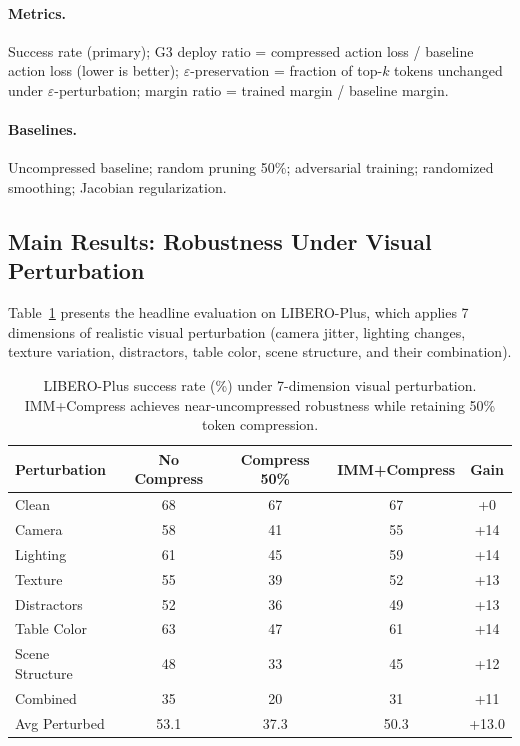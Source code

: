 \documentclass[conference]{corl_2026}
\begin{document}
\paragraph{Metrics.} Success rate (primary); G3 deploy ratio = compressed action loss / baseline action loss (lower is better); $\varepsilon$-preservation = fraction of top-$k$ tokens unchanged under $\varepsilon$-perturbation; margin ratio = trained margin / baseline margin.

\paragraph{Baselines.} Uncompressed baseline; random pruning 50\%; adversarial training; randomized smoothing; Jacobian regularization.

\subsection{Main Results: Robustness Under Visual Perturbation}
\label{sec:main_results}

Table~\ref{tab:libero_plus} presents the headline evaluation on LIBERO-Plus, which applies 7 dimensions of realistic visual perturbation (camera jitter, lighting changes, texture variation, distractors, table color, scene structure, and their combination).

\begin{table}[t]
\centering
\caption{LIBERO-Plus success rate (\%) under 7-dimension visual perturbation. IMM+Compress achieves near-uncompressed robustness while retaining 50\% token compression.}
\label{tab:libero_plus}
\small
\begin{tabular}{@{}lccc|c@{}}
\toprule
Perturbation & No Compress & Compress 50\% & IMM+Compress & Gain \\
\midrule
Clean & 68 & 67 & 67 & +0 \\
Camera & 58 & 41 & 55 & +14 \\
Lighting & 61 & 45 & 59 & +14 \\
Texture & 55 & 39 & 52 & +13 \\
Distractors & 52 & 36 & 49 & +13 \\
Table Color & 63 & 47 & 61 & +14 \\
Scene Structure & 48 & 33 & 45 & +12 \\
Combined & 35 & 20 & 31 & +11 \\
\midrule
Avg Perturbed & 53.1 & 37.3 & 50.3 & +13.0 \\
\bottomrule
\end{tabular}
\end{table}
\end{document}
